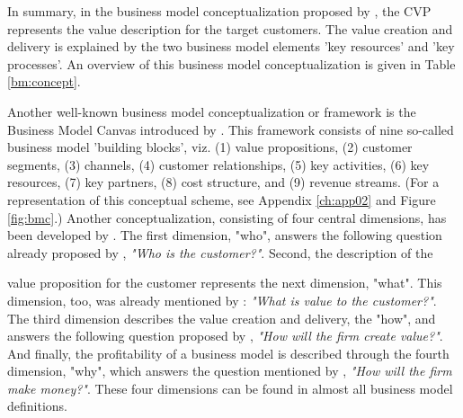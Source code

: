 In summary, in the business model conceptualization proposed by \citet[p. 54]{Johnson2008}, the \ac{CVP} represents the value description for the target customers. The value creation and delivery is explained by the two business model elements 'key resources' and 'key processes'. An overview of this business model conceptualization is given in Table \ref{bm:concept}.

Another well-known business model conceptualization or framework is the Business Model Canvas  introduced by \citet{Osterwalder2010}. This framework consists of nine so-called business model 'building blocks', viz. (1) value propositions, (2) customer segments, (3) channels, (4) customer relationships, (5) key activities, (6) key resources, (7) key partners, (8) cost structure, and (9) revenue streams. (For a representation of this conceptual scheme, see Appendix \ref{ch:app02} and Figure \ref{fig:bmc}.) Another conceptualization, consisting of four central dimensions, has been developed by \citet{Frankenberger2013}. The first dimension, "who", answers the following question already proposed by \citet[pp. 49-61]{Drucker1954}, \textit{"Who is the customer?"}. Second, the description of the\linebreak 
\vspace*{-\baselineskip}
 
\noindent value proposition for the customer represents the next dimension, "what". This dimension, too, was already mentioned by \citet[pp. 49-61]{Drucker1954}: \textit{"What is value to the customer?"}. The third dimension describes the value creation and delivery, the "how", and answers the following question proposed by \citet[pp. 729-732]{Morris2005}, \textit{"How will the firm create value?"}. And finally, the profitability of a business model is described through the fourth dimension, "why", which answers the question mentioned by \citet[pp. 729-732]{Morris2005}, \textit{"How will the firm make money?"}. These four dimensions can be found in almost all business model definitions.

